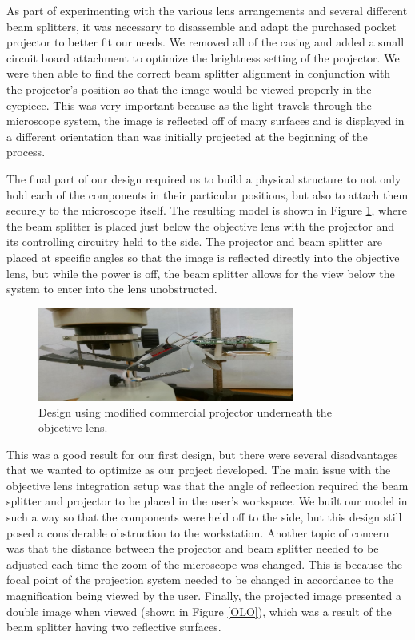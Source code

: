 \documentclass[12pt,a4paper]{article}
\begin{document}
\begin{appendices}
As part of experimenting with the various lens arrangements and several different beam splitters, it was necessary to disassemble and adapt the purchased pocket projector to better fit our needs.  We removed all of the casing and added a small circuit board attachment to optimize the brightness setting of the projector.  We were then able to find the correct beam splitter alignment in conjunction with the projector’s position so that the image would be viewed properly in the eyepiece.  This was very important because as the light travels through the microscope system, the image is reflected off of many surfaces and is displayed in a different orientation than was initially projected at the beginning of the process.

The final part of our design required us to build a physical structure to not only hold each of the components in their particular positions, but also to attach them securely to the microscope itself.  The resulting model is shown in Figure \ref{OLS}, where the beam splitter is placed just below the objective lens with the projector and its controlling circuitry held to the side.  The projector and beam splitter are placed at specific angles so that the image is reflected directly into the objective lens, but while the power is off, the beam splitter allows for the view below the system to enter into the lens unobstructed.

\begin{figure}[h]
	\centering
	\includegraphics[width = 0.75\textwidth]{pics/objective_lens_setup.jpg}
	\caption[Objective Lens Setup]{\centering Design using modified commercial projector underneath the objective lens.}
	\label{OLS}
\end{figure}


This was a good result for our first design, but there were several disadvantages that we wanted to optimize as our project developed.  The main issue with the objective lens integration setup was that the angle of reflection required the beam splitter and projector to be placed in the user’s workspace.  We built our model in such a way so that the components were held off to the side, but this design still posed a considerable obstruction to the workstation.  Another topic of concern was that the distance between the projector and beam splitter needed to be adjusted each time the zoom of the microscope was changed.  This is because the focal point of the projection system needed to be changed in accordance to the magnification being viewed by the user.  Finally, the projected image presented a double image when viewed (shown in Figure \ref{OLO}), which was a result of the beam splitter having two reflective surfaces.


\end{appendices}
\end{document}
